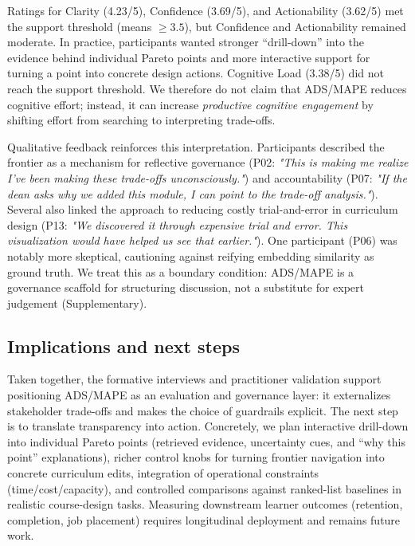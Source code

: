 \documentclass{article}
\newcommand{\ADS}{\textsc{ADS}\xspace}
\newcommand{\MAPE}{\textsc{MAPE}\xspace}
\begin{document}
Ratings for {Clarity} (4.23/5), {Confidence} (3.69/5), and {Actionability} (3.62/5) met the support threshold (means $\ge 3.5$), but Confidence and Actionability remained moderate. In practice, participants wanted stronger ``drill-down'' into the evidence behind individual Pareto points and more interactive support for turning a point into concrete design actions. {Cognitive Load} (3.38/5) did not reach the support threshold. We therefore do not claim that \ADS/\MAPE reduces cognitive effort; instead, it can increase \emph{productive cognitive engagement} by shifting effort from searching to interpreting trade-offs.

Qualitative feedback reinforces this interpretation. Participants described the frontier as a mechanism for reflective governance (P02: \textit{"This is making me realize I've been making these trade-offs unconsciously."}) and accountability (P07: \textit{"If the dean asks why we added this module, I can point to the trade-off analysis."}). Several also linked the approach to reducing costly trial-and-error in curriculum design (P13: \textit{"We discovered it through expensive trial and error. This visualization would have helped us see that earlier."}). One participant (P06) was notably more skeptical, cautioning against reifying embedding similarity as ground truth. We treat this as a boundary condition: \ADS/\MAPE is a governance scaffold for structuring discussion, not a substitute for expert judgement (Supplementary).

\subsection{Implications and next steps}
Taken together, the formative interviews and practitioner validation support positioning \ADS/\MAPE as an evaluation and governance layer: it externalizes stakeholder trade-offs and makes the choice of guardrails explicit. The next step is to translate transparency into action. Concretely, we plan interactive drill-down into individual Pareto points (retrieved evidence, uncertainty cues, and ``why this point'' explanations), richer control knobs for turning frontier navigation into concrete curriculum edits, integration of operational constraints (time/cost/capacity), and controlled comparisons against ranked-list baselines in realistic course-design tasks. Measuring downstream learner outcomes (retention, completion, job placement) requires longitudinal deployment and remains future work.
\end{document}
